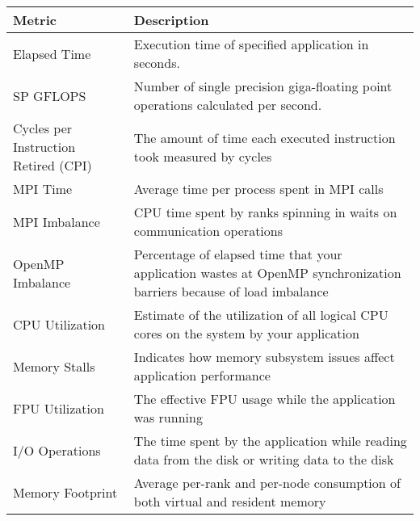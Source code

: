 \begin{tabular}{p{}p{}}\toprule			
\textbf{Metric}	&	\textbf{Description}	\\
\midrule[0.1pt]\vspace{-10pt}			
Elapsed Time	&	Execution time of specified application in seconds.	\\
SP GFLOPS	&	Number of single precision giga-floating point operations calculated per second.	\\
Cycles per Instruction Retired (CPI)	&	The amount of time each executed instruction took measured by cycles	\\
MPI Time	&	Average time per process spent in MPI calls	\\
MPI Imbalance	&	CPU time spent by ranks spinning in waits on communication operations	\\
OpenMP Imbalance	&	Percentage of elapsed time that your application wastes at OpenMP synchronization barriers because of load imbalance	\\
CPU Utilization	&	Estimate of the utilization of all logical CPU cores on the system by your application	\\
Memory Stalls	&	Indicates how memory subsystem issues affect application performance	\\
FPU Utilization	&	The effective FPU usage while the application was running	\\
I/O Operations	&	 The time spent by the application while reading data from the disk or writing data to the disk	\\
Memory Footprint	&	Average per-rank and per-node consumption of both virtual and resident memory	\\
\bottomrule\end{tabular}			